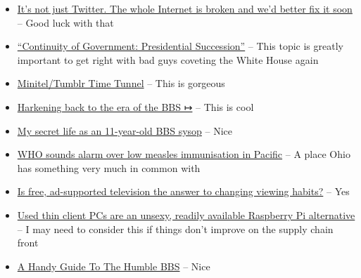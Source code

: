 \begin{itemize}
{  GUYS, THIS IS NUTS EVEN FOR TRUMP} -- Yeah, Molly Jong-Fast identified
  more weirdness that should disturb us all
\item
  \href{https://theconversation.com/its-not-just-twitter-the-whole-internet-is-broken-and-wed-better-fix-it-soon-195712}{It's
  not just Twitter. The whole Internet is broken and we'd better fix it
  soon} -- Good luck with that
\item
  \href{https://electionlawblog.org/?p=133513}{``Continuity of
  Government: Presidential Succession''} -- This topic is greatly
  important to get right with bad guys coveting the White House again
\item
  \href{https://www.nycresistor.com/2013/05/24/miniteltumblr-time-tunnel/}{Minitel/Tumblr
  Time Tunnel} -- This is gorgeous
\item
  \href{https://sixcolors.com/link/2022/12/harkening-back-to-the-era-of-the-bbs/}{Harkening
  back to the era of the BBS ↦} -- This is cool
\item
  \href{https://arstechnica.com/?p=1898410}{My secret life as an
  11-year-old BBS sysop} -- Nice
\item
  \href{https://www.rnz.co.nz/international/pacific-news/479812/who-sounds-alarm-over-low-measles-immunisation-in-pacific}{WHO
  sounds alarm over low measles immunisation in Pacific} -- A place Ohio
  has something very much in common with
\item
  \href{https://www.cbc.ca/news/entertainment/the-rise-of-fast-tv-1.6668088?cmp=rss}{Is
  free, ad-supported television the answer to changing viewing habits?}
  -- Yes
\item
  \href{https://arstechnica.com/?p=1900569}{Used thin client PCs are an
  unsexy, readily available Raspberry Pi alternative} -- I may need to
  consider this if things don't improve on the supply chain front
\item
  \href{https://hackaday.com/2022/11/29/a-handy-guide-to-the-humble-bbs/}{A
  Handy Guide To The Humble BBS} -- Nice
\end{itemize}
